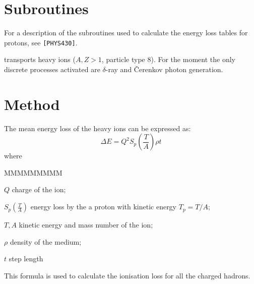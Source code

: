   

\section{Subroutines}

For a description of the subroutines used to calculate the energy
loss tables for protons, see {\tt [PHYS430]}.


 transports heavy ions ($A,Z > 1$, particle
type 8). For the moment the
only discrete processes activated are $\delta$-ray and \v{C}erenkov
photon generation.

\section{Method}

The mean energy loss of the heavy ions can be expressed as:
\begin{equation}
\Delta E = Q^{2} S_{p} \left ( \frac{T}{A} \right ) \rho t
\end{equation}
where
\begin{DLtt}{MMMMMMMMM}
\item[$Q$] charge of the ion;
\item[$\displaystyle S_{p} \left ( \frac{T}{A} \right )$]
energy loss by the a proton with kinetic energy $T_{p} = T/A$;
\item[$T,A$] kinetic energy and mass number of the ion;
\item[$\rho$] density of the medium;
\item[$t$] step length
\end{DLtt}

This formula is used to calculate the ionisation loss for all the charged
hadrons.


